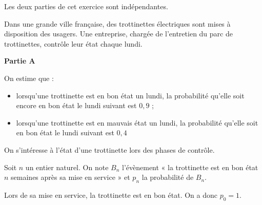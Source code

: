 Les deux parties de cet exercice sont indépendantes.

\smallskip

Dans une grande ville française, des trottinettes électriques sont mises à disposition des usagers. Une entreprise, chargée de l'entretien du parc de trottinettes, contrôle leur état chaque lundi.

\bigskip

\textbf{Partie A}

\medskip

On estime que :

\begin{itemize}
	\item lorsqu'une trottinette est en bon état un lundi, la probabilité qu'elle soit encore en bon état le lundi suivant est $0,9$ ;
	\item lorsqu'une trottinette est en mauvais état un lundi, la probabilité qu'elle soit en bon
	état le lundi suivant est $0,4$ 
\end{itemize}

On s'intéresse à l'état d'une trottinette lors des phases de contrôle.

Soit $n$ un entier naturel. On note $B_n$ l'évènement « la trottinette est en bon état $n$ semaines
après sa mise en service » et $p_n$ la probabilité de $B_n$.

Lors de sa mise en service, la trottinette est en bon état. On a donc $p_0 = 1$.

